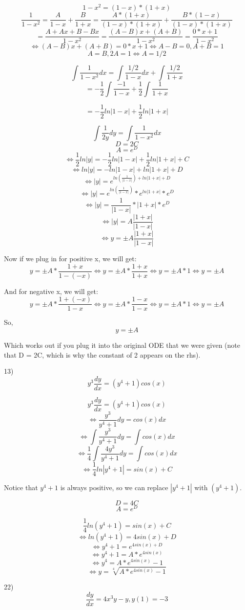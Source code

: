 \documentclass{article}
\begin{document}
\[1 - x^2 = (1-x)*(1+x)\]
\[\frac{1}{1-x^2} = \frac{A}{1-x} + \frac{B}{1+x}
= \frac{A*(1+x)}{(1-x)*(1+x)} + \frac{B*(1-x)}{(1-x)*(1+x)}\]
\[= \frac{A+Ax + B-Bx}{1-x^2}
= \frac{(A-B)x + (A+B)}{1-x^2}
= \frac{0*x + 1}{1-x^2}
\]
\[
\iff (A-B)x + (A+B) = 0*x + 1
\iff A-B = 0, A+B = 1
\]
\[A = B, 2A = 1 \iff A = 1/2\]

\[\int \frac{1}{1-x^2}dx
= \int \frac{1/2}{1-x}dx + \int \frac{1/2}{1+x}
\]
\[
= -\frac{1}{2}\int \frac{-1}{1-x} + \frac{1}{2}\int \frac{1}{1+x}
\]

\[
= -\frac{1}{2}ln|1-x| + \frac{1}{2}ln|1+x|
\]

\[\int \frac{1}{2y}dy = \int \frac{1}{1-x^2}dx\]
\[D = 2C\]
\[A = e^D\]
\[\iff \frac{1}{2}ln|y| = -\frac{1}{2}ln|1-x| + \frac{1}{2}ln|1+x| + C\]
\[\iff ln|y| = -ln|1-x| + ln|1+x| + D\]
\[\iff |y| = e^{ln(\frac{1}{|1-x|}) + ln|1+x| + D}\]
\[\iff |y| = e^{ln(\frac{1}{|1-x|})} * e^{ln|1+x|} * e^D\]
\[\iff |y| = \frac{1}{|1-x|} * |1+x| * e^D\]
\[\iff |y| = A\frac{|1+x|}{|1-x|}\]
\[\iff y = \pm A\frac{|1+x|}{|1-x|}\]

Now if we plug in for positive x, we will get:
\[y = \pm A*\frac{1+x}{1-(-x)}
\iff y = \pm A*\frac{1+x}{1+x}
\iff y = \pm A * 1
\iff y = \pm A\]

And for negative x, we will get:
\[y = \pm A*\frac{1+(-x)}{1-x}
\iff y = \pm A*\frac{1-x}{1-x}
\iff y = \pm A*1
\iff y = \pm A\]

So,
\[y = \pm A\]

Which works out if you plug it into the original ODE that we were given 
(note that D = 2C, which is why the constant of 2 appears on the rhs).


13) \[y^3 \frac{dy}{dx} = (y^4 + 1)cos(x)\]

\[y^3 \frac{dy}{dx} = (y^4 + 1)cos(x)\]
\[\iff \frac{y^3}{y^4+1}dy = cos(x) dx\]
\[\iff \int \frac{y^3}{y^4+1}dy = \int cos(x) dx\]
\[\iff \frac{1}{4}\int \frac{4y^3}{y^4+1}dy = \int cos(x) dx\]
\[\iff \frac{1}{4}ln|y^4 + 1| = sin(x) + C\]

Notice that $y^4 + 1$ is always positive,
so we can replace $|y^4 + 1|$ with $(y^4 + 1)$.

\[D = 4C\]
\[A = e^D\]

\[\frac{1}{4}ln(y^4 + 1) = sin(x) + C\]
\[\iff ln(y^4 + 1) = 4sin(x) + D\]
\[\iff y^4 + 1 = e^{4sin(x) + D}\]
\[\iff y^4 + 1 = A*e^{4sin(x)}\]
\[\iff y^4 = A*e^{4sin(x)} -  1\]
\[\iff y = \sqrt[4]{A*e^{4sin(x)} -  1}\]


22) \[\frac{dy}{dx} = 4x^3y - y, y(1) = -3\]
\end{document}
